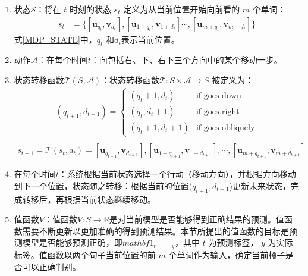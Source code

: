 \begin{enumerate}
	\item 状态$\mathcal{S}$：将在 $t$ 时刻的状态 $s_t$ 定义为从当前位置开始向前看的 $m$ 个单词：
	\begin{equation}\label{MDP_STATE}
	\begin{aligned}
		s_t &= \{[\mathbf{u}_{q_t}, \mathbf{v}_{d_t}], [\mathbf{u}_{1+q_t},\mathbf{v}_{1+d_t}] \cdots, [\mathbf{u}_{m+q_t}, \mathbf{v}_{m+d_t}]\}
	\end{aligned}
	\end{equation}
	式\eqref{MDP_STATE}中，$q_t$ 和$d_t$表示当前位置。
	\item 动作$\mathcal{A}$：在每个时间$t$：向包括右、下、右下三个方向中的某个移动一步。
	\item 状态转移函数$\mathcal{T}(S,\mathcal{A})$：状态转移函数$\mathcal{T}:S\times \mathcal{A}\rightarrow S$ 被定义为：
	\begin{equation}\label{MDP_STATE}
	\begin{aligned}
		(q_{t+1}, d_{t+1}) =
\begin{cases}
(q_{t} + 1, d_{t}) &\text{if goes down} \\
(q_{t}, d_{t} + 1) &\text{if goes right}  \\
(q_{t} + 1, d_{t} + 1) &\text{if goes obliquely}
\end{cases} \\
	\end{aligned}
	\end{equation}
	\begin{equation}\label{MDP_STATE}
	\begin{aligned}
		s_{t+1} = \mathcal{T}(s_t,a_t)=[\mathbf{u}_{q_{t+1}},\mathbf{v}_{d_{t+1}}],[\mathbf{u}_{1+q_{t+1}},\mathbf{v}_{1+d_{t+1}}],\cdots,[\mathbf{u}_{m+q_{t+1}},\mathbf{v}_{m+d_{t+1}}]
	\end{aligned}
	\end{equation}
	\item 在每个时间$t$：系统根据当前状态选择一个行动（移动方向），并根据方向移动到下一个位置，状态随之转移：根据当前的位置($q_{t+1},d_{t+1}$)更新未来状态，完成转移后，再根据当前状态继续移动。
	\item 值函数$V$：值函数$V: S\rightarrow \mathbb{R}$是对当前模型是否能够得到正确结果的预测。值函数需要不断更新以更加准确的得到预测结果。本节所提出的值函数的目标是预测模型是否能够预测正确，即$mathbf{1}_{t==y}$，其中 $t$ 为预测标签， $y$ 为实际标签。值函数以两个句子当前位置的前 $m$ 个单词作为输入，确定当前橘子是否可以正确判别。
	

\end{enumerate}
